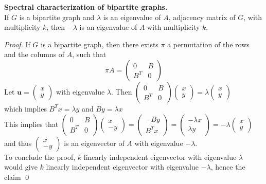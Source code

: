 \begin{proposition}{\textbf{Spectral characterization of bipartite graphs.}} \\
If $ G $ is a bipartite graph and $ \lambda $ is an eigenvalue of $ A $, adjacency matrix of $ G $, with multiplicity $ k $, then $ -\lambda $ is an eigenvalue of $ A $ with multiplicity $ k $.
\begin{proof}
If $ G $ is a bipartite graph, then there exists $ \pi $ a permutation of the rows and the columns of $ A $, such that
\[ \pi A = 
\begin{pmatrix}
0   & B \\
B^T & 0\
\end{pmatrix}
\]
Let $ \mathbf{u}= \begin{pmatrix}
x \\y
\end{pmatrix} $ with eigenvalue $ \lambda $. Then
$
\begin{pmatrix}
	0   & B \\
	B^T & 0\
\end{pmatrix}
\begin{pmatrix}
x \\
y
\end{pmatrix}
= \lambda
\begin{pmatrix}
x \\
y
\end{pmatrix}
$ \\
which implies $ B^T x=\lambda y $ and $ By=\lambda x $ \\
This implies that 
$
\begin{pmatrix}
0   & B \\
B^T & 0\
\end{pmatrix}
\begin{pmatrix}
x \\
-y
\end{pmatrix}
=
\begin{pmatrix}
-By \\
B^Tx
\end{pmatrix}
=
\begin{pmatrix}
-\lambda x \\
\lambda  y
\end{pmatrix}
=
-\lambda
\begin{pmatrix}
x \\
y
\end{pmatrix}
$ \\
and thus $
\begin{pmatrix}
x \\
-y
\end{pmatrix} $
is an eigenvector of $ A $ with eigenvalue $ - \lambda $. \\
To conclude the proof, $ k $ linearly independent eigenvector with eigenvalue $ \lambda $ would give $ k $ linearly independent eigenvector with eigenvalue $ - \lambda $, hence the claim
\qed
\end{proof}
\end{proposition}
